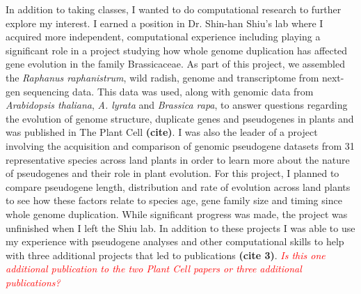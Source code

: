 \documentclass[12pt]{amsart}
\newcommand{\mbh}[1]{\textcolor{red}{ \emph{\scriptsize  #1}} }
\begin{document}
In addition to taking classes, I wanted to do computational research to further explore my interest.  
I earned a position in Dr. Shin-han Shiu's lab where I acquired more independent,  computational experience including playing a significant role in a project studying how whole genome duplication has affected gene evolution in the family Brassicaceae.  
As part of this project, we assembled the \textit{Raphanus raphanistrum}, wild radish, genome and transcriptome from next-gen sequencing data.  
This data was used, along with genomic data from \textit{Arabidopsis thaliana}, \textit{A. lyrata} and \textit{Brassica rapa}, to answer questions regarding the evolution of genome structure, duplicate genes and pseudogenes in plants and was published in The Plant Cell \textbf{(cite)}. 
I was also the leader of a project involving the acquisition and comparison of genomic pseudogene datasets from 31 representative species across land plants in order to learn more about the nature of pseudogenes and their role in plant evolution.  
For this project, I planned to compare pseudogene length, distribution and rate of evolution across land plants to see how these factors relate to species age, gene family size and timing since whole genome duplication.  
While significant progress was made, the project was unfinished when I left the Shiu lab.  
In addition to these projects I was able to use my experience with pseudogene analyses and other computational skills to help with three additional projects that led to publications \textbf{(cite 3)}. \mbh{Is this one additional publication to the two Plant Cell papers or three additional publications?}
\end{document}
